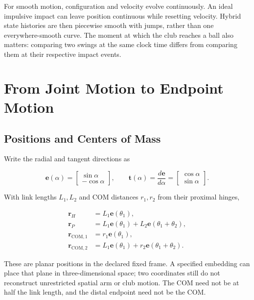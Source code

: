 For smooth motion, configuration and velocity evolve continuously. An ideal impulsive impact can leave position continuous while resetting velocity. Hybrid state histories are then piecewise smooth with jumps, rather than one everywhere-smooth curve. The moment at which the club reaches a ball also matters: comparing two swings at the same clock time differs from comparing them at their respective impact events.

\section{From Joint Motion to Endpoint Motion}\label{ch02:from-joint-motion-to-endpoint-motion}

\subsection{Positions and Centers of Mass}\label{ch02:positions-and-centers-of-mass}

\protect{}\label{ch02:position-kinematics}{}

Write the radial and tangent directions as

\[
\bm e(\alpha)=\begin{bmatrix}\sin\alpha\\-\cos\alpha\end{bmatrix},
\qquad
\bm t(\alpha)=\frac{d\bm e}{d\alpha}
=\begin{bmatrix}\cos\alpha\\\sin\alpha\end{bmatrix}.
\]

With link lengths \(L_1,L_2\) and COM distances \(r_1,r_2\) from their proximal hinges,

\[
\begin{aligned}
\bm r_H&=L_1\bm e(\theta_1),\\
\bm r_P&=L_1\bm e(\theta_1)+L_2\bm e(\theta_1+\theta_2),\\
\bm r_{\mathrm{COM},1}&=r_1\bm e(\theta_1),\\
\bm r_{\mathrm{COM},2}&=L_1\bm e(\theta_1)+r_2\bm e(\theta_1+\theta_2).
\end{aligned}
\]

These are planar positions in the declared fixed frame. A specified embedding can place that plane in three-dimensional space; two coordinates still do not reconstruct unrestricted spatial arm or club motion. The COM need not be at half the link length, and the distal endpoint need not be the COM.

